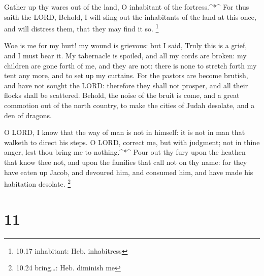  Gather up thy wares out of the land, O inhabitant of the
fortress.\^{}*\^{}  For thus saith the LORD, Behold, I will
sling out the inhabitants of the land at this once, and will distress
them, that they may find it so. \footnote{10.17 inhabitant: Heb.
  inhabitress}

 Woe is me for my hurt! my wound is grievous: but I said,
Truly this is a grief, and I must bear it.  My tabernacle
is spoiled, and all my cords are broken: my children are gone forth of
me, and they are not: there is none to stretch forth my tent any more,
and to set up my curtains.  For the pastors are become
brutish, and have not sought the LORD: therefore they shall not prosper,
and all their flocks shall be scattered.  Behold, the noise
of the bruit is come, and a great commotion out of the north country, to
make the cities of Judah desolate, and a den of dragons.

 O LORD, I know that the way of man is not in himself: it
is not in man that walketh to direct his steps.  O LORD,
correct me, but with judgment; not in thine anger, lest thou bring me to
nothing.\^{}*\^{}  Pour out thy fury upon the heathen that
know thee not, and upon the families that call not on thy name: for they
have eaten up Jacob, and devoured him, and consumed him, and have made
his habitation desolate. \footnote{10.24 bring\ldots: Heb. diminish me}

\hypertarget{section-10}{%
\section{11}\label{section-10}}

